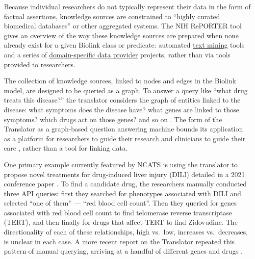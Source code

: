 Because individual researchers do not typically represent their data in
the form of factual assertions, knowledge sources are constrained to
``highly curated biomedical databases'' or other aggregated systems. The
NIH RePORTER tool
\href{https://reporter.nih.gov/search/DShVUhB_ZUq0X5UWFjy5WQ/projects?shared=true}{gives
an overview} of the way these knowledge sources are prepared when none
already exist for a given Biolink class or predicate: automated
\href{https://reporter.nih.gov/project-details/10548337}{text mining}
tools and a series of
\href{https://reporter.nih.gov/project-details/10056962}{domain-specific
data provider} projects, rather than via tools provided to researchers.

The collection of knowledge sources, linked to nodes and edges in the
Biolink model, are designed to be queried as a graph. To answer a query
like ``what drug treats this disease?'' the translator considers the
graph of entities linked to the disease: what symptoms does the disease
have? what genes are linked to those symptoms? which drugs act on those
genes? and so on \citep{renaissancecomputinginstituterenciBiomedicalDataTranslator2022} . The
form of the Translator as a graph-based question answering machine
bounds its application as a platform for researchers to guide their
research and clinicians to guide their care \citep{hailuNIHfundedProjectAims2019} , rather than a tool for linking data.

One primary example currently featured by NCATS is using the translator
to propose novel treatments for drug-induced liver injury (DILI) \citep{renaissancecomputinginstituterenciUseCasesShow2022}  detailed in
a 2021 conference paper \citep{goelExplanationContainerCaseBased2021} . To find a candidate drug, the researchers manually conducted three
API queries: first they searched for phenotypes associated with DILI and
selected ``one of them'' --- ``red blood cell count''. Then they queried for genes
associated with red blood cell count to find telomerase reverse
transcriptase (TERT), and then finally for drugs that affect TERT to
find Zidovudine. The directionality of each of these relationships, high
vs.~low, increases vs.~decreases, is unclear in each case. A more recent
report on the Translator repeated this pattern of manual querying,
arriving at a handful of different genes and drugs \citep{fechoProgressUniversalBiomedical2022} .

